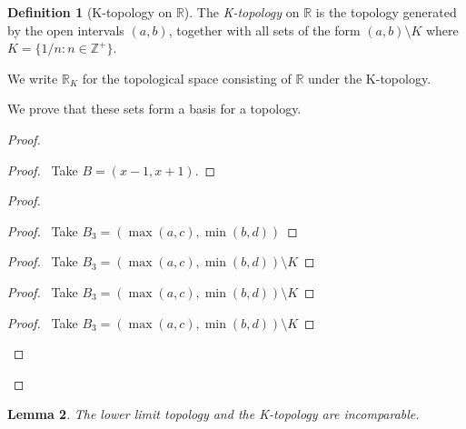\documentclass{book}
\newtheorem{lm}{Lemma}[chapter]
\theoremstyle{definition}
\newtheorem{df}[lm]{Definition}
\begin{document}
  \begin{df}[K-topology on $\mathbb{R}$]
    The \emph{K-topology} on $\mathbb{R}$ is the topology generated by 
    the open intervals $(a,b)$, together with all sets of the form $(a,b) 
    \setminus 
    K$ where $K = \{ 1/n : n \in \mathbb{Z}^+ \}$.
    
    We write $\mathbb{R}_K$ for the topological space consisting of 
    $\mathbb{R}$ 
    under the K-topology.
    
    We prove that these sets form a basis for a topology.
  \end{df}
  
  \begin{proof}
    \begin{proof}
      \pf\ Take $B = (x-1,x+1)$.
    \end{proof}
    \begin{proof}
      \begin{proof}
        \pf\ Take $B_3 = (\max(a,c), \min(b,d))$
      \end{proof}
      \begin{proof}
        \pf\ Take $B_3 = (\max(a,c), \min(b,d)) \setminus K$
      \end{proof}
      \begin{proof}
        \pf\ Take $B_3 = (\max(a,c), \min(b,d)) \setminus K$
      \end{proof}
      \begin{proof}
        \pf\ Take $B_3 = (\max(a,c), \min(b,d)) \setminus K$
      \end{proof}
    \end{proof}
  \end{proof}
  
  \begin{lm}
    The lower limit topology and the K-topology are incomparable.
  \end{lm}
  
\end{document}
